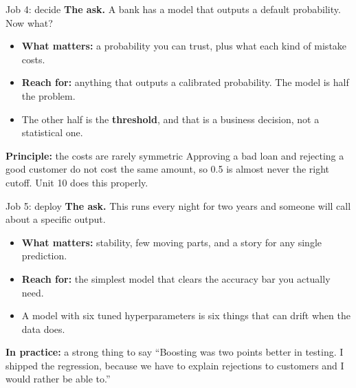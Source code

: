 \documentclass[aspectratio=169]{beamer}
\newenvironment{principle}[1]{\begin{block}{\textbf{Principle:} #1}}{\end{block}}
\newenvironment{practice}[1]{\begin{exampleblock}{\textbf{In practice:} #1}}{\end{exampleblock}}
\begin{document}
\begin{frame}{Job 4: decide}
\textbf{The ask.} A bank has a model that outputs a default probability. Now what?
\begin{itemize}
  \item \textbf{What matters:} a probability you can trust, plus what each kind of mistake costs.
  \item \textbf{Reach for:} anything that outputs a calibrated probability. The model is half the
        problem.
  \item The other half is the \textbf{threshold}, and that is a business decision, not a
        statistical one.
\end{itemize}
\begin{principle}{the costs are rarely symmetric}
Approving a bad loan and rejecting a good customer do not cost the same amount, so 0.5 is almost
never the right cutoff. Unit 10 does this properly.
\end{principle}
\end{frame}

\begin{frame}{Job 5: deploy}
\textbf{The ask.} This runs every night for two years and someone will call about a specific
output.
\begin{itemize}
  \item \textbf{What matters:} stability, few moving parts, and a story for any single
        prediction.
  \item \textbf{Reach for:} the simplest model that clears the accuracy bar you actually need.
  \item A model with six tuned hyperparameters is six things that can drift when the data does.
\end{itemize}
\begin{practice}{a strong thing to say}
``Boosting was two points better in testing. I shipped the regression, because we have to explain
rejections to customers and I would rather be able to.''
\end{practice}
\end{frame}
\end{document}
